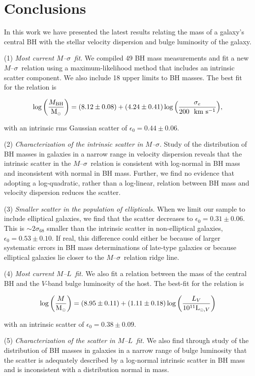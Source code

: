 \documentclass[twosided,letterpaper,numberedappendix]{emulateapj}
\newcommand{\beq}{
\begin{equation}
}
\newcommand{\eeq}{
\end{equation}
}
\newcommand{\msun}     {\ensuremath{{\rm M}_{\scriptscriptstyle \odot}}}
\newcommand{\kms}      {\ensuremath{~\mathrm{km~s^{-1}}}}
\newcommand{\msigma}   {\ensuremath{M}{--}\ensuremath{\sigma}}
\newcommand{\ml}       {\ensuremath{M}{--}\ensuremath{L}}
\newcommand{\mbh}      {\ensuremath{M_{\mathrm{BH}}}}
\newcommand{\sigmaconf}   {\ensuremath{\sigma_{68}}}
\newcommand{\msinterr} {\ensuremath{8.12 \pm 0.08}}
\newcommand{\msslopeerr} {\ensuremath{4.24 \pm 0.41}}
\newcommand{\msscaterr} {\ensuremath{0.44 \pm 0.06}}
\newcommand{\mlinterr} {\ensuremath{8.95 \pm 0.11}}
\newcommand{\mlslopeerr} {\ensuremath{1.11 \pm 0.18}}
\newcommand{\mlscaterr} {\ensuremath{0.38 \pm 0.09}}
\begin{document}
\section{Conclusions}
\label{concl}

In this work we have presented the latest results relating the mass of
a galaxy's central BH with the stellar velocity dispersion and
bulge luminosity of the galaxy.


(1) \emph{Most current \msigma\ fit.}  We compiled 49 BH mass
   measurements and fit a new \msigma\ relation using a
   maximum-likelihood method that includes an intrinsic scatter
   component.  We also include 18 upper limits to BH masses.  The best
   fit for the relation is
%
%
   \beq
   \log{\left(\frac{\mbh}{\msun}\right)} = (\msinterr) + (\msslopeerr) \log{\left(\frac{\sigma_e}{200~\kms}\right)},
   \label{e:concnoulmsigmafit}
   \eeq
%
   with an intrinsic rms Gaussian scatter of $\epsilon_0 = \msscaterr$.

(2) \emph{Characterization of the intrinsic scatter in \msigma.}
   Study of the distribution of BH masses in galaxies in a narrow
   range in velocity dispersion reveals that the intrinsic scatter in
   the \msigma\ relation is consistent with log-normal in BH mass and
   inconsistent with normal in BH mass.  Further, we find no evidence
   that adopting a log-quadratic, rather than a log-linear, relation
   between BH mass and velocity dispersion reduces the scatter.  

(3) \emph{Smaller scatter in the population of ellipticals.}  When we
   limit our sample to include elliptical galaxies, we find that the
   scatter decreases to $\epsilon_0 = 0.31 \pm 0.06$.  This is
   $\sim2\sigmaconf$ smaller than the intrinsic scatter in
   non-elliptical galaxies, $\epsilon_0 = 0.53 \pm 0.10$.  If real,
   this difference could either be because of larger systematic errors
   in BH mass determinations of late-type galaxies or because
   elliptical galaxies lie closer to the \msigma\ relation ridge line.


(4) \emph{Most current \ml\ fit.}  We also fit a relation
   between the mass of the central BH and the $V$-band bulge
   luminosity of the host.  The best-fit for the relation is
%
%
   \beq 
   \log{\left(\frac{M}{\msun}\right)} = (\mlinterr) + (\mlslopeerr) \log{\left(\frac{L_V}{10^{11} {\rm L}_{{\scriptscriptstyle \odot}, V}}\right)}
   \label{e:concnoulmlfit}
   \eeq
%
   with an intrinsic scatter of $\epsilon_0 = \mlscaterr$.  


(5) \emph{Characterization of the scatter in \ml\ fit.}  We also
   find through study of the distribution of BH masses in
   galaxies in a narrow range of bulge luminosity that the scatter is
   adequately described by a log-normal intrinsic scatter in BH mass 
   and is inconsistent with a distribution normal in mass.
\end{document}
